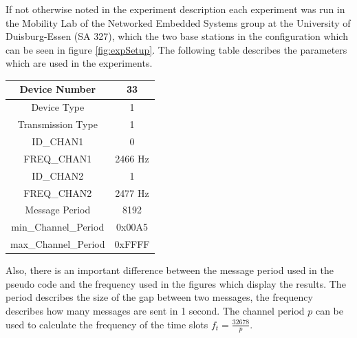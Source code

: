 If not otherwise noted in the experiment description each experiment was run in the Mobility Lab of the Networked Embedded Systems group at the University of Duisburg-Essen (SA 327), which the two base stations in the configuration which can be seen in figure \ref{fig:expSetup}. The following table describes the parameters which are used in the experiments.
\begin{center}
\begin{tabular}{|c|c|}
	\hline Device Number & 33 \\ 
	\hline Device Type & 1 \\ 
	\hline Transmission Type & 1 \\ 
	\hline ID\_CHAN1 & 0 \\ 
	\hline FREQ\_CHAN1 & 2466 Hz \\ 
	\hline ID\_CHAN2 & 1 \\ 
	\hline FREQ\_CHAN2 & 2477 Hz \\ 
	\hline Message Period & 8192 \\ 
	\hline min\_Channel\_Period & 0x00A5 \\ 
	\hline max\_Channel\_Period & 0xFFFF \\ 
	\hline 
\end{tabular} 		
\end{center}

Also, there is an important difference between the message period used in the pseudo code and the frequency used in the figures which display the results. The period describes the size of the gap between two messages, the frequency describes how many messages are sent in 1 second. The channel period $p$ can be used to calculate the frequency of the time slots $f_t = \frac{32678}{p}$.  
\newpage

